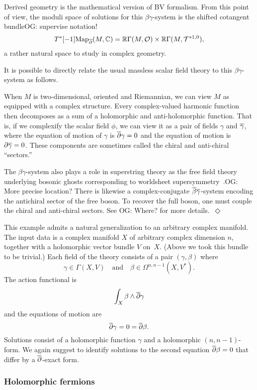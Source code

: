 \documentclass[11pt]{amsart}
\def\owen#1{{\textcolor{violet!50!black}{OG: {#1}}}}
\begin{document}
Derived geometry is the mathematical version of BV formalism.
From this point of view, the moduli space of solutions for this $\beta\gamma$-system is the shifted cotangent bundle\owen{supervise notation!}
\[
T^*[-1] \Map_\dbar(M,\CC) = \RR\Gamma(M,\cO) \times \RR\Gamma(M,\cT^{*{1,0}}),
\]
a rather natural space to study in complex geometry.

\begin{rmk}
It is possible to directly relate the usual massless scalar field theory to this $\beta\gamma$-system as follows.

When $M$ is two-dimensional, oriented and Riemannian,
we can view $M$ as equipped with a complex structure.
Every complex-valued harmonic function then decomposes as a sum of a holomorphic and anti-holomorphic function. 
That is, if we complexify the scalar field $\phi$, 
we can view it as a pair of fields $\gamma$ and $\Bar{\gamma}$,
where the equation of motion of $\gamma$ is $\dbar \gamma = 0$ and the equation of motion is $\partial \Bar{\gamma} = 0$.
These components are sometimes called the chiral and anti-chiral ``sectors.'' 

The $\beta\gamma$-system also plays a role in superstring theory as the free field theory underlying bosonic ghosts corresponding to worldsheet supersymmetry~\cite{Polchinski}.\owen{More precise location?}
There is likewise a complex-conjugate $\Bar{\beta}\Bar{\gamma}$-system encoding the antichiral sector of the free boson.
To recover the full boson, one must couple the chiral and anti-chiral sectors.
See \cite{Kapustin,GGW} \owen{Where?} for more details.~\hfill$\Diamond$
\end{rmk}

This example admits a natural generalization to an arbitrary complex manifold.
The input data is a complex manifold $X$ of arbitrary complex dimension $n$, 
together with a holomorphic vector bundle $V$ on~$X$.
(Above we took this bundle to be trivial.)
Each field of the theory consists of a pair $(\gamma,\beta)$ where 
\[
\gamma \in \Gamma(X,V) \quad\text{and}\quad \beta \in \Omega^{n,n-1}(X,V^*) .
\]
The action functional is 
\[
\int_X \beta \wedge \dbar \gamma
\]
and the equations of motion are
\[
\dbar \gamma = 0 = \dbar \beta.
\]
Solutions consist of a holomorphic function $\gamma$ and a holomorphic $(n,n-1)$-form.
We again suggest to identify solutions to the second equation $\dbar \beta = 0$ that differ by a $\dbar$-exact form.

\subsubsection{Holomorphic fermions}
\end{document}
